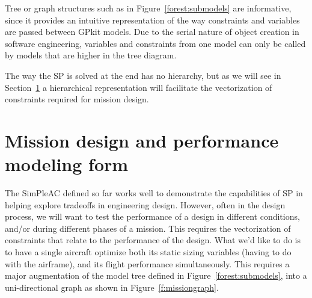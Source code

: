 Tree or graph structures such as in Figure~\ref{forest:submodels} are informative, since
it provides an intuitive representation of the way constraints and variables
are passed between GPkit models. Due to the serial nature of object creation in software engineering,
variables and constraints from one model can only be called by models that are higher in the tree diagram.


The way the \gls{SP} is solved at the end has no
hierarchy, but as we will see in Section~\ref{s:mission} a hierarchical representation
will facilitate the vectorization of constraints required for mission design.


\section{Mission design and performance modeling form}
\label{s:mission}

The SimPleAC defined so far works well to demonstrate the
capabilities of \gls{SP} in helping explore tradeoffs in engineering design.
However, often in the design process, we will want to test the performance of a
design in different conditions, and/or during different phases of a mission.
This requires the vectorization of
constraints that relate to the performance of the design. What we'd like to do
is to have a single aircraft optimize both its static sizing variables (having
to do with the airframe), and its flight performance simultaneously. This requires a major
augmentation of the model tree defined in Figure~\ref{forest:submodels}, into a
uni-directional graph as shown in Figure~\ref{f:missiongraph}.

